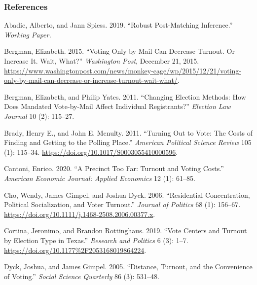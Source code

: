 \documentclass[
  12pt,
]{article}
\newlength{\cslhangindent}
\newenvironment{cslreferences}%
  {\setlength{\parindent}{0pt}%
  \everypar{\setlength{\hangindent}{\cslhangindent}}\ignorespaces}%
  {\par}
\begin{document}
\newpage

\hypertarget{references}{%
\subsubsection*{References}\label{references}}

\hypertarget{refs}{}
\begin{cslreferences}
\leavevmode\hypertarget{ref-Abadie2019}{}%
Abadie, Alberto, and Jann Spiess. 2019. ``Robust Post-Matching Inference.'' \emph{Working Paper.}

\leavevmode\hypertarget{ref-Bergman2015}{}%
Bergman, Elizabeth. 2015. ``Voting Only by Mail Can Decrease Turnout. Or Increase It. Wait, What?'' \emph{Washington Post}, December 21, 2015. \url{https://www.washingtonpost.com/news/monkey-cage/wp/2015/12/21/voting-only-by-mail-can-decrease-or-increase-turnout-wait-what/}.

\leavevmode\hypertarget{ref-Bergman2011}{}%
Bergman, Elizabeth, and Philip Yates. 2011. ``Changing Election Methods: How Does Mandated Vote-by-Mail Affect Individual Registrants?'' \emph{Election Law Journal} 10 (2): 115--27.

\leavevmode\hypertarget{ref-Brady2011}{}%
Brady, Henry E., and John E. Mcnulty. 2011. ``Turning Out to Vote: The Costs of Finding and Getting to the Polling Place.'' \emph{American Political Science Review} 105 (1): 115--34. \url{https://doi.org/10.1017/S0003055410000596}.

\leavevmode\hypertarget{ref-Cantoni2020}{}%
Cantoni, Enrico. 2020. ``A Precinct Too Far: Turnout and Voting Costs.'' \emph{American Economic Journal: Applied Economics} 12 (1): 61--85.

\leavevmode\hypertarget{ref-Cho2006}{}%
Cho, Wendy, James Gimpel, and Joshua Dyck. 2006. ``Residential Concentration, Political Socialization, and Voter Turnout.'' \emph{Journal of Politics} 68 (1): 156--67. \url{https://doi.org/10.1111/j.1468-2508.2006.00377.x}.

\leavevmode\hypertarget{ref-Cortina2019}{}%
Cortina, Jeronimo, and Brandon Rottinghaus. 2019. ``Vote Centers and Turnout by Election Type in Texas.'' \emph{Research and Politics} 6 (3): 1--7. \url{https://doi.org/10.1177\%2F2053168019864224}.

\leavevmode\hypertarget{ref-Dyck2005}{}%
Dyck, Joshua, and James Gimpel. 2005. ``Distance, Turnout, and the Convenience of Voting.'' \emph{Social Science Quarterly} 86 (3): 531--48.


\end{cslreferences}
\end{document}
